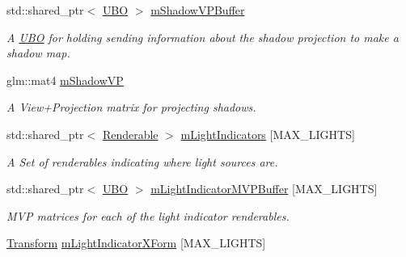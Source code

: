 \begin{DoxyCompactItemize}
\mbox{\label{class_vk_app_abc2f36606bc8913aeba7878dead43e37}} 
std\+::shared\+\_\+ptr$<$ \mbox{\hyperlink{struct_u_b_o}{U\+BO}} $>$ \mbox{\hyperlink{class_vk_app_abc2f36606bc8913aeba7878dead43e37}{m\+Shadow\+V\+P\+Buffer}}
\begin{DoxyCompactList}\small\item\em A \mbox{\hyperlink{struct_u_b_o}{U\+BO}} for holding sending information about the shadow projection to make a shadow map. \end{DoxyCompactList}\item 
\mbox{\label{class_vk_app_a3cbb2ec1f9aed246a8fa86044fa29011}} 
glm\+::mat4 \mbox{\hyperlink{class_vk_app_a3cbb2ec1f9aed246a8fa86044fa29011}{m\+Shadow\+VP}}
\begin{DoxyCompactList}\small\item\em A View+\+Projection matrix for projecting shadows. \end{DoxyCompactList}\item 
\mbox{\label{class_vk_app_af990851ec3658757a00557c1d9776360}} 
std\+::shared\+\_\+ptr$<$ \mbox{\hyperlink{class_renderable}{Renderable}} $>$ \mbox{\hyperlink{class_vk_app_af990851ec3658757a00557c1d9776360}{m\+Light\+Indicators}} \mbox{[}M\+A\+X\+\_\+\+L\+I\+G\+H\+TS\mbox{]}
\begin{DoxyCompactList}\small\item\em A Set of renderables indicating where light sources are. \end{DoxyCompactList}\item 
\mbox{\label{class_vk_app_aa1a0a3f336f638cb541dc830f262540a}} 
std\+::shared\+\_\+ptr$<$ \mbox{\hyperlink{struct_u_b_o}{U\+BO}} $>$ \mbox{\hyperlink{class_vk_app_aa1a0a3f336f638cb541dc830f262540a}{m\+Light\+Indicator\+M\+V\+P\+Buffer}} \mbox{[}M\+A\+X\+\_\+\+L\+I\+G\+H\+TS\mbox{]}
\begin{DoxyCompactList}\small\item\em M\+VP matrices for each of the light indicator renderables. \end{DoxyCompactList}\item 
\mbox{\label{class_vk_app_a2c28c300b2c21900185bb56f2d37993c}} 
\mbox{\hyperlink{class_transform}{Transform}} \mbox{\hyperlink{class_vk_app_a2c28c300b2c21900185bb56f2d37993c}{m\+Light\+Indicator\+X\+Form}} \mbox{[}M\+A\+X\+\_\+\+L\+I\+G\+H\+TS\mbox{]}

\end{DoxyCompactItemize}
